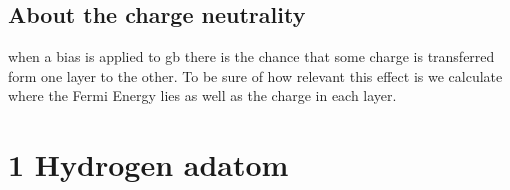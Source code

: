 \subsection{About the charge neutrality}
when a bias is applied to \ac{gb} there is the chance that some charge is transferred form one layer to the other\cite{Wang2016a,Zhang2009}. To be sure of how relevant this effect is we calculate where the Fermi Energy lies as well as the charge in each layer.



\section{1 Hydrogen adatom}
